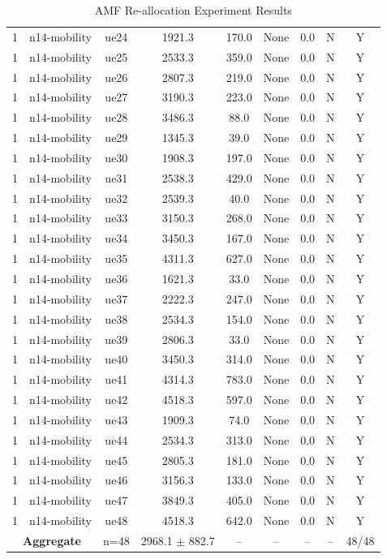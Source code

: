 \begin{table}[ht]
\begin{tabular}{|c|c|c|c|c|c|c|c|c|}
1 & n14-mobility & ue24 & 1921.3 & 170.0 & None & 0.0 & N & Y \\
1 & n14-mobility & ue25 & 2533.3 & 359.0 & None & 0.0 & N & Y \\
1 & n14-mobility & ue26 & 2807.3 & 219.0 & None & 0.0 & N & Y \\
1 & n14-mobility & ue27 & 3190.3 & 223.0 & None & 0.0 & N & Y \\
1 & n14-mobility & ue28 & 3486.3 & 88.0 & None & 0.0 & N & Y \\
1 & n14-mobility & ue29 & 1345.3 & 39.0 & None & 0.0 & N & Y \\
1 & n14-mobility & ue30 & 1908.3 & 197.0 & None & 0.0 & N & Y \\
1 & n14-mobility & ue31 & 2538.3 & 429.0 & None & 0.0 & N & Y \\
1 & n14-mobility & ue32 & 2539.3 & 40.0 & None & 0.0 & N & Y \\
1 & n14-mobility & ue33 & 3150.3 & 268.0 & None & 0.0 & N & Y \\
1 & n14-mobility & ue34 & 3450.3 & 167.0 & None & 0.0 & N & Y \\
1 & n14-mobility & ue35 & 4311.3 & 627.0 & None & 0.0 & N & Y \\
1 & n14-mobility & ue36 & 1621.3 & 33.0 & None & 0.0 & N & Y \\
1 & n14-mobility & ue37 & 2222.3 & 247.0 & None & 0.0 & N & Y \\
1 & n14-mobility & ue38 & 2534.3 & 154.0 & None & 0.0 & N & Y \\
1 & n14-mobility & ue39 & 2806.3 & 33.0 & None & 0.0 & N & Y \\
1 & n14-mobility & ue40 & 3450.3 & 314.0 & None & 0.0 & N & Y \\
1 & n14-mobility & ue41 & 4314.3 & 783.0 & None & 0.0 & N & Y \\
1 & n14-mobility & ue42 & 4518.3 & 597.0 & None & 0.0 & N & Y \\
1 & n14-mobility & ue43 & 1909.3 & 74.0 & None & 0.0 & N & Y \\
1 & n14-mobility & ue44 & 2534.3 & 313.0 & None & 0.0 & N & Y \\
1 & n14-mobility & ue45 & 2805.3 & 181.0 & None & 0.0 & N & Y \\
1 & n14-mobility & ue46 & 3156.3 & 133.0 & None & 0.0 & N & Y \\
1 & n14-mobility & ue47 & 3849.3 & 405.0 & None & 0.0 & N & Y \\
1 & n14-mobility & ue48 & 4518.3 & 642.0 & None & 0.0 & N & Y \\
\multicolumn{2}{|c|}{\textbf{Aggregate}} & n=48 & 2968.1 $\pm$ 882.7 & -- & -- & -- & -- & 48/48 \\
\hline
\end{tabular}
\caption{AMF Re-allocation Experiment Results}
\label{tab:amf_realloc}
\end{table}
